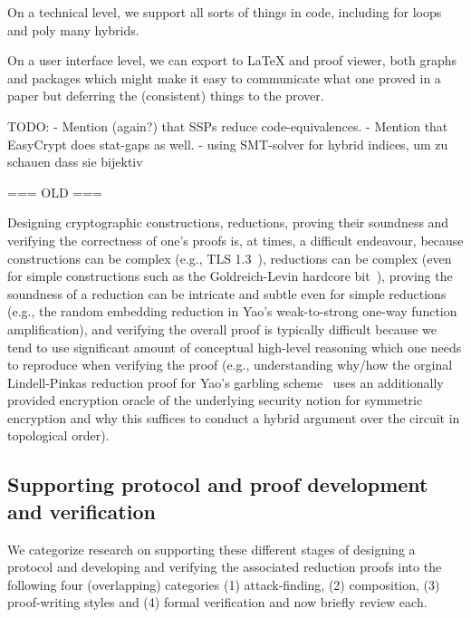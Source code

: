 On a technical level, we support all sorts of things in code, including for loops
and poly many hybrids.

On a user interface level, we can export to LaTeX and proof viewer, both graphs and packages which might make it easy to communicate what one proved in a paper but
deferring the (consistent) things to the prover.















TODO:
- Mention (again?) that SSPs reduce code-equivalences.
- Mention that EasyCrypt does stat-gaps as well. 
- using SMT-solver for hybrid indices, um zu schauen dass sie bijektiv




\iffalse
=== OLD ===

Designing cryptographic constructions, reductions, proving their soundness and verifying the correctness of one's proofs is, at times, a difficult endeavour, because constructions can be complex (e.g., TLS 1.3~\cite{X}), reductions can be complex (even for simple constructions such as the Goldreich-Levin hardcore bit~\cite{X}), proving the soundness of a reduction can be intricate and subtle even for simple reductions (e.g., the random embedding reduction in Yao's weak-to-strong one-way function amplification), and verifying the overall proof is typically difficult because we tend to use significant amount of conceptual high-level reasoning which one needs to reproduce when verifying the proof (e.g., understanding why/how the orginal Lindell-Pinkas reduction proof for Yao's garbling scheme~\cite{X} uses an additionally provided encryption oracle of the underlying security notion for symmetric encryption and why this suffices to conduct a hybrid argument over the circuit in topological order).

\subsection{Supporting protocol and proof development and verification}
We categorize research on supporting these different stages of designing a protocol and developing and verifying the associated reduction proofs into the following four (overlapping) categories (1) attack-finding, (2) composition, (3) proof-writing styles and (4) formal verification and now briefly review each.

